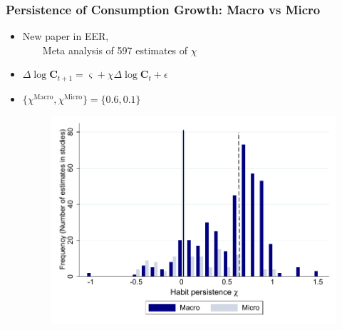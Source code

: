 \documentclass{beamer}\usepackage{dcolumn}
\newcommand{\jemph}[1]{{\color{StataDarkBlue}#1}}
\providecommand{\jemph}[1]{{\color{jirkasblue}#1}}
\begin{document}
\begin{frame}
  \frametitle{Persistence of Consumption Growth: Macro vs Micro}

  \begin{itemize}
  \item New paper in EER, \cite*{havranek:metaHabits}\\ ~~~~Meta analysis of 597 estimates of $\chi$
  \item $ \Delta \log \mathbf{C}_{t+1} = \varsigma + \chi \Delta \log \mathbf{C}_t +\epsilon $
  \item  \jemph{$\{\chi^{\text{Macro}},\chi^{\text{Micro}}\} = \{0.6,0.1\}$}
  \begin{figure}
\begin{center}
\includegraphics[width=.75\textwidth]{../Figures/microMacroMetaHistogram}
\end{center}
\end{figure}

  \end{itemize}

\end{frame}
\end{document}
